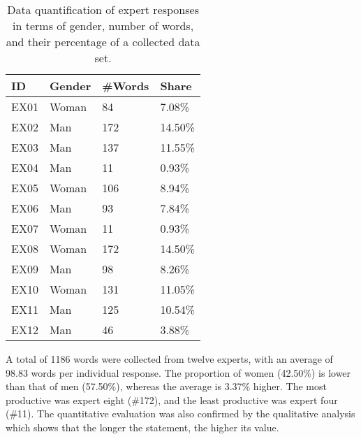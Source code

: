 \documentclass[preprint,12pt,number]{elsarticle}
\begin{document}
\begin{table}[h]
\caption{Data quantification of expert responses in terms of gender, number of words, and their percentage of a collected data set.}
\label{tab:data-quant}
\footnotesize
\centering
\begin{tabular}{|l|l|l|l|}
\hline
\textbf{ID}    & \textbf{Gender}   & \textbf{\#Words} & \textbf{Share}    \\ \hline
EX01 & Woman & 84      & 7.08\%   \\ \hline
EX02 & Man   & 172     & 14.50\%  \\ \hline
EX03 & Man   & 137     & 11.55\%  \\ \hline
EX04 & Man   & 11      & 0.93\%   \\ \hline
EX05 & Woman & 106     & 8.94\%   \\ \hline
EX06 & Man   & 93      & 7.84\%   \\ \hline
EX07 & Woman & 11      & 0.93\%   \\ \hline
EX08 & Woman & 172     & 14.50\%  \\ \hline
EX09 & Man   & 98      & 8.26\%   \\ \hline
EX10 & Woman & 131     & 11.05\%  \\ \hline
EX11 & Man   & 125     & 10.54\%  \\ \hline
EX12 & Man   & 46      & 3.88\%   \\ \hline
\end{tabular}
\end{table}

A total of 1186 words were collected from twelve experts, with an average of 98.83 words per individual response. The proportion of women (42.50\%) is lower than that of men (57.50\%), whereas the average is 3.37\% higher.
The most productive was expert eight (\#172), and the least productive was expert four (\#11). The quantitative evaluation was also confirmed by the qualitative analysis which shows that the longer the statement, the higher its value. 
\end{document}

